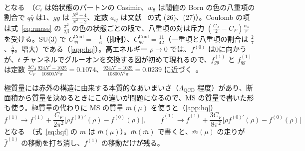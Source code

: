 \documentclass[a4paper,10pt]{ltjsarticle}
\newcommand{\MSbar}{\overline{\mathrm{MS}}}
\begin{document}
となる~\cite{cm10}（$C_i$ は始状態のパートンの Casimir、$w_{\mathbf 8}$ は閾値の Born の色の八重項の割合で $q\bar q$ は1、$gg$ は $\frac{N^2-4}{N^2-2}$、定数 $a_{ij}$ は文献~\cite{cm10} の式 (26)、(27)）。Coulomb の項は式~\eqref{eq:rmass} の $\frac{\pi^2}{2\beta}$ の色の状態ごとの版で、八重項の対は斥力 $(\frac{C_A}2-C_F)\frac{\alpha_s}r$ を受ける。SU(3) で $C^{\mathrm{Coul}}_{q\bar q}=-\frac16$（抑制）、$C^{\mathrm{Coul}}_{gg}=\frac{11}{42}$（一重項と八重項の割合は $\frac27$、$\frac57$。増大）である（\ref{app:hq}）。高エネルギー $\rho\to0$ では、$f^{(0)}$ は0に向かうが、$t$ チャンネルでグルーオンを交換する図が初めて現れるので、$f^{(1)}_{gg}$ と $f^{(1)}_{qg}$ は定数 $\frac{2C_A}{C_F}\frac{924N^2-1025}{10800N^2\pi}=0.1074$、$\frac{924N^2-1025}{10800N^2\pi}=0.0239$ に近づく~\cite{cm10}。

極質量には赤外の構造に由来する本質的なあいまいさ（$\Lambda_{\mathrm{QCD}}$ 程度）があり、断面積から質量を決めるときにこの違いが問題になるので、$\MSbar$ の質量で書いた形も使う。極質量の代わりに $\MSbar$ の質量 $\bar m(\mu)$ を使うと（\ref{app:hq}）
\begin{equation}
f^{(1)}\to f^{(1)}+\frac{C_F}{2\pi^2}\bigl[\rho f^{(0)\prime}(\rho)-f^{(0)}(\rho)\bigr],\qquad
\bar f^{(1)}\to\bar f^{(1)}+\frac{3C_F}{8\pi^2}\bigl[\rho f^{(0)\prime}(\rho)-f^{(0)}(\rho)\bigr]
\label{eq:hqmsbar}
\end{equation}
となる~\cite{lmu09}（式~\eqref{eq:hqf} の $m$ は $\bar m(\mu)$）。$\bar m(\bar m)$ で書くと、$\bar m(\mu)$ の走りが $\bar f^{(1)}$ の移動を打ち消し、$f^{(1)}$ の移動だけが残る。
\end{document}
